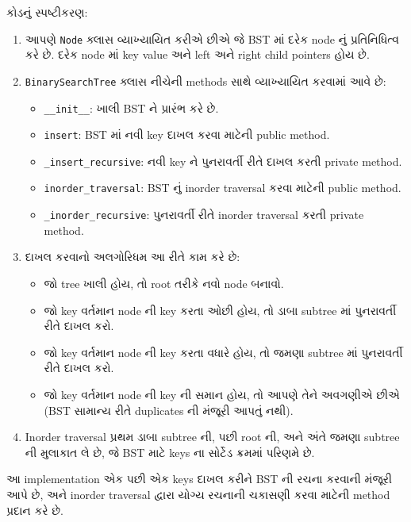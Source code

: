 \begin{Shaded}
\begin{Highlighting}[]
\OperatorTok{=}
\OperatorTok{=}\NormalTok{ [}\NormalTok{, }\NormalTok{, }\NormalTok{, }\NormalTok{, }\NormalTok{, }\NormalTok{, }\NormalTok{]}

\NormalTok{(}

\NormalTok{(}\NormalTok{)}
\end{Highlighting}
\end{Shaded}

કોડનું સ્પષ્ટીકરણ:

\begin{enumerate}
\def\labelenumi{\arabic{enumi}.}
\item
  આપણે \texttt{Node} ક્લાસ વ્યાખ્યાયિત કરીએ છીએ જે BST માં દરેક node નું
  પ્રતિનિધિત્વ કરે છે. દરેક node માં key value અને left અને right child pointers
  હોય છે.
\item
  \texttt{BinarySearchTree} ક્લાસ નીચેની methods સાથે વ્યાખ્યાયિત કરવામાં આવે
  છે:

  \begin{itemize}
  \tightlist
  \item
    \texttt{\_\_init\_\_}: ખાલી BST ને પ્રારંભ કરે છે.
  \item
    \texttt{insert}: BST માં નવી key દાખલ કરવા માટેની public method.
  \item
    \texttt{\_insert\_recursive}: નવી key ને પુનરાવર્તી રીતે દાખલ કરતી
    private method.
  \item
    \texttt{inorder\_traversal}: BST નું inorder traversal કરવા માટેની
    public method.
  \item
    \texttt{\_inorder\_recursive}: પુનરાવર્તી રીતે inorder traversal કરતી
    private method.
  \end{itemize}
\item
  દાખલ કરવાનો અલગોરિધમ આ રીતે કામ કરે છે:

  \begin{itemize}
  \tightlist
  \item
    જો tree ખાલી હોય, તો root તરીકે નવો node બનાવો.
  \item
    જો key વર્તમાન node ની key કરતા ઓછી હોય, તો ડાબા subtree માં પુનરાવર્તી
    રીતે દાખલ કરો.
  \item
    જો key વર્તમાન node ની key કરતા વધારે હોય, તો જમણા subtree માં પુનરાવર્તી
    રીતે દાખલ કરો.
  \item
    જો key વર્તમાન node ની key ની સમાન હોય, તો આપણે તેને અવગણીએ છીએ (BST
    સામાન્ય રીતે duplicates ની મંજૂરી આપતું નથી).
  \end{itemize}
\item
  Inorder traversal પ્રથમ ડાબા subtree ની, પછી root ની, અને અંતે જમણા
  subtree ની મુલાકાત લે છે, જે BST માટે keys ના સોર્ટેડ ક્રમમાં પરિણમે છે.
\end{enumerate}

આ implementation એક પછી એક keys દાખલ કરીને BST ની રચના કરવાની મંજૂરી આપે છે,
અને inorder traversal દ્વારા યોગ્ય રચનાની ચકાસણી કરવા માટેની method પ્રદાન કરે
છે.
